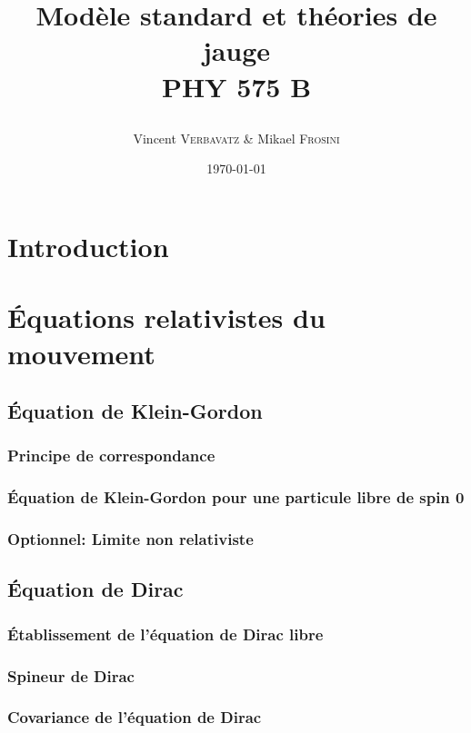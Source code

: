 \documentclass{article}
\title{Modèle standard et théories de jauge \n{2} \\\textsc{PHY 575 B}\\\n2 \date{\today}}
\author{Vincent \textsc{Verbavatz} \& Mikael \textsc{Frosini}}
\begin{document}
		
		\maketitle
		\pagebreak
		\tableofcontents
		
		\pagebreak
		
	\section{Introduction}

	\section{Équations relativistes du mouvement}
			
		\subsection{Équation de Klein-Gordon}
			\subsubsection{Principe de correspondance}
			\subsubsection{Équation de Klein-Gordon pour une particule libre de spin 0}
			\subsubsection{Optionnel: Limite non relativiste}
		\subsection{Équation de Dirac}
			\subsubsection{Établissement de l'équation de Dirac libre}
			\subsubsection{Spineur de Dirac}
			\subsubsection{Covariance de l'équation de Dirac}
\end{document}
